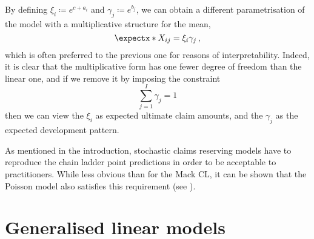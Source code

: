 \documentclass[a4paper]{book}
\begin{document}
By defining $\xi_i \coloneqq e^{c + a_i}$ and $\gamma_j \coloneqq e^{b_j}$, we can obtain a different parametrisation of the model with a multiplicative structure for the mean,
\begin{equation}
  \expect{X_{ij}} = \xi_i \gamma_j \,,
\end{equation}
which is often preferred to the previous one for reasons of interpretability. Indeed, it is clear that the multiplicative form has one fewer degree of freedom than the linear one, and if we remove it by imposing the constraint
\begin{equation}
  \sum_{j = 1}^I \gamma_j = 1
\end{equation}
then we can view the $\xi_i$ as expected ultimate claim amounts, and the $\gamma_j$ as the expected development pattern.

As mentioned in the introduction, stochastic claims reserving models have to reproduce the chain ladder point predictions in order to be acceptable to practitioners. While less obvious than for the Mack CL, it can be shown that the Poisson model also satisfies this requirement (see \cite[Lemma 2.16]{wuthrich:stochastic-reserving}).

\section{Generalised linear models} \label{sec:glm}
\end{document}
